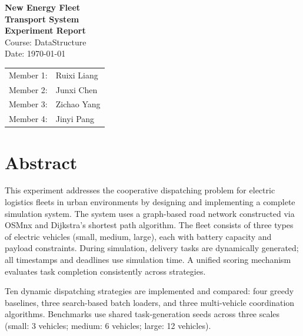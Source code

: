 \documentclass[12pt,a4paper,oneside]{book}
\begin{document}
\begin{titlepage}
    \begin{center}
        \vspace*{3cm}
        {\Huge\textbf{New Energy Fleet}}\\[4pt]
        {\Huge\textbf{Transport System}}\\[12pt]
        {\Large\textbf{Experiment Report}}\\[2cm]
        {\large Course: DataStructure}\\[0.8cm]
        {\large Date: \today}\\[3cm]
        \begin{tabular}{rl}
            Member 1: & Ruixi Liang \\
            Member 2: & Junxi Chen \\
            Member 3: & Zichao Yang \\
            Member 4: & Jinyi Pang \\
        \end{tabular}
        \vfill
    \end{center}
\end{titlepage}

\chapter*{Abstract}

This experiment addresses the cooperative dispatching problem for electric logistics fleets in urban environments by designing and implementing a complete simulation system. The system uses a graph-based road network constructed via OSMnx and Dijkstra's shortest path algorithm. The fleet consists of three types of electric vehicles (small, medium, large), each with battery capacity and payload constraints. During simulation, delivery tasks are dynamically generated; all timestamps and deadlines use simulation time. A unified scoring mechanism evaluates task completion consistently across strategies.

Ten dynamic dispatching strategies are implemented and compared: four greedy baselines, three search-based batch loaders, and three multi-vehicle coordination algorithms. Benchmarks use shared task-generation seeds across three scales (small: 3 vehicles; medium: 6 vehicles; large: 12 vehicles).
\end{document}
